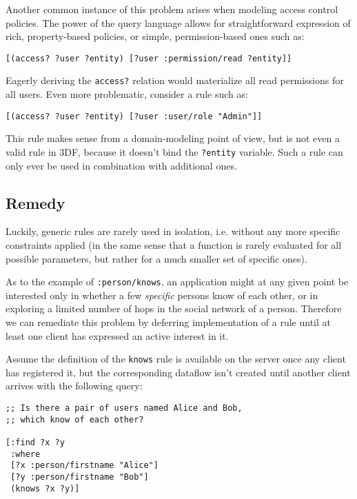 \documentclass[../catalog.tex]{subfiles}
\begin{document}
Another common instance of this problem arises when modeling access
control policies. The power of the query language allows for
straightforward expression of rich, property-based policies, or
simple, permission-based ones such as:

\begin{verbatim}
[(access? ?user ?entity) [?user :permission/read ?entity]]
\end{verbatim}

Eagerly deriving the \texttt{access?} relation would materialize all
read permissions for all users. Even more problematic, consider a rule
such as:

\begin{verbatim}
[(access? ?user ?entity) [?user :user/role "Admin"]]
\end{verbatim}

This rule makes sense from a domain-modeling point of view, but is not
even a valid rule in 3DF, because it doesn't bind the \texttt{?entity}
variable. Such a rule can only ever be used in combination with
additional ones.

\subsection{Remedy}

Luckily, generic rules are rarely used in isolation, i.e. without any
more specific constraints applied (in the same sense that a function
is rarely evaluated for all possible parameters, but rather for a much
smaller set of specific ones).

As to the example of \texttt{:person/knows}, an application might at
any given point be interested only in whether a few \emph{specific}
persons know of each other, or in exploring a limited number of hops
in the social network of a person. Therefore we can remediate this
problem by deferring implementation of a rule until at least one
client has expressed an active interest in it.

Assume the definition of the \texttt{knows} rule is available on the
server once any client has registered it, but the corresponding
dataflow isn't created until another client arrives with the following
query:

\begin{verbatim}
;; Is there a pair of users named Alice and Bob, 
;; which know of each other?

[:find ?x ?y
 :where
 [?x :person/firstname "Alice"]
 [?y :person/firstname "Bob"]
 (knows ?x ?y)]
\end{verbatim}
\end{document}
